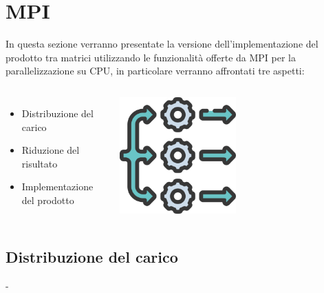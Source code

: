 \documentclass[compress]{beamer}
\begin{document}
\section{MPI}

\begin{frame}{\secname}
    In questa sezione verranno presentate la versione dell'implementazione del prodotto tra matrici utilizzando le funzionalità offerte da MPI per la parallelizzazione su CPU, in particolare verranno affrontati tre aspetti:
    \vspace{0.5cm}
    \begin{columns}
            \begin{minipage}[b]{1\textwidth}
                \begin{itemize}
                    \item Distribuzione del carico
                    \item Riduzione del risultato
                    \item Implementazione del prodotto
                \end{itemize}
            \end{minipage}
                \begin{minipage}{1\textwidth}
                    \begin{adjustbox}{margin=0cm 0cm 0cm 0.3cm, center} %
                        \includegraphics[width=0.5\textwidth]{resources/parallel_icon.png}
                    \end{adjustbox}
                \end{minipage}
    \end{columns}
\end{frame}

\subsection{Distribuzione del carico}
\begin{frame}{\secname \text{ }- \subsecname\ }
\end{frame}
\end{document}
